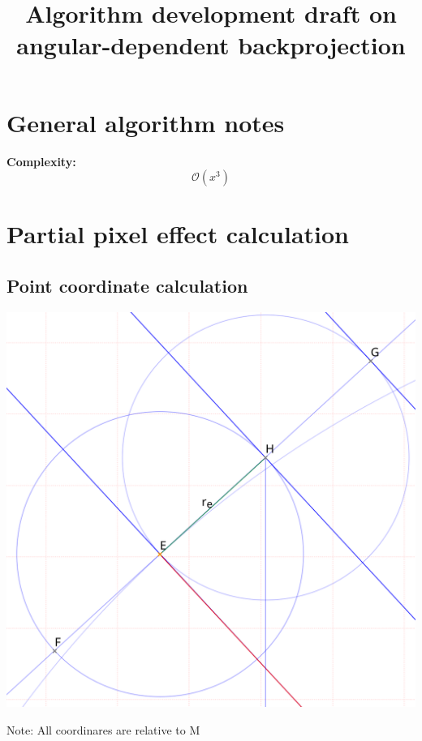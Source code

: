 \documentclass[a4paper,10pt,fleqn]{scrartcl}
\date{}
\title{Algorithm development draft on angular-dependent backprojection}
\numberwithin{equation}{subsection}
\begin{document}
\maketitle\tableofcontents
\section{General algorithm notes}
\textbf{Complexity:}
\begin{equation*}
\mathcal{O}(x^3)
\end{equation*}
\section{Partial pixel effect calculation}
\subsection{Point coordinate calculation}
\begin{minipage}{0.6\textwidth}
\includegraphics[width=\textwidth]{mappicschema}
\end{minipage}
\small\textrm{Note: All coordinares are relative to M}\\
\normalsize
\end{document}
